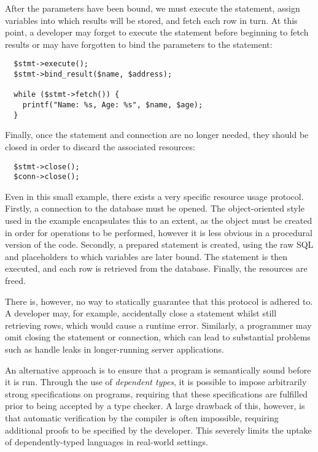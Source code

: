 \documentclass[preprint]{sigplanconf}
\begin{document}
After the parameters have been bound, we must execute the statement, assign variables into which results will be stored, and fetch each row in turn. At this point, a developer may forget to execute the statement before beginning to fetch results or may have forgotten to bind the parameters to the statement:

{\small
\begin{verbatim}
  $stmt->execute();
  $stmt->bind_result($name, $address);

  while ($stmt->fetch()) {
    printf("Name: %s, Age: %s", $name, $age);
  }
\end{verbatim}
}

Finally, once the statement and connection are no longer needed, they should be closed in order to discard the associated resources:

{\small
\begin{verbatim}
  $stmt->close();
  $conn->close();
\end{verbatim}
}

Even in this small example, there exists a very specific resource usage protocol. Firstly, a connection to the database must be opened. The object-oriented style used in the example encapsulates this to an extent, as the object must be created in order for operations to be performed, however it is less obvious in a procedural version of the code. Secondly, a prepared statement is created, using the raw SQL and placeholders to which variables are later bound. The statement is then executed, and each row is retrieved from the database. Finally, the resources are freed. 

There is, however, no way to statically guarantee that this protocol is adhered to. A developer may, for example, accidentally close a statement whilst still retrieving rows, which would cause a runtime error. Similarly, a programmer may omit closing the statement or connection, which can lead to substantial problems such as handle leaks in longer-running server applications.

An alternative approach is to ensure that a program is semantically sound before it is run. Through the use of \textit{dependent types}, it is possible to impose arbitrarily strong specifications on programs, requiring that these specifications are fulfilled prior to being accepted by a type checker. A large drawback of this, however, is that automatic verification by the compiler is often impossible, requiring additional proofs to be specified by the developer. This severely limits the uptake of dependently-typed languages in real-world settings.
\end{document}
